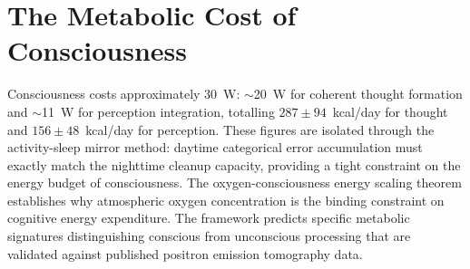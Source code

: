 \chapter{The Metabolic Cost of Consciousness}
\label{ch:metabolic_cost}


\begin{chapterabstract}
Consciousness costs approximately 30~W: $\sim$20~W for coherent thought formation and $\sim$11~W for perception integration, totalling $287 \pm 94$~kcal/day for thought and $156 \pm 48$~kcal/day for perception. These figures are isolated through the activity-sleep mirror method: daytime categorical error accumulation must exactly match the nighttime cleanup capacity, providing a tight constraint on the energy budget of consciousness. The oxygen-consciousness energy scaling theorem establishes why atmospheric oxygen concentration is the binding constraint on cognitive energy expenditure. The framework predicts specific metabolic signatures distinguishing conscious from unconscious processing that are validated against published positron emission tomography data.
\end{chapterabstract}


